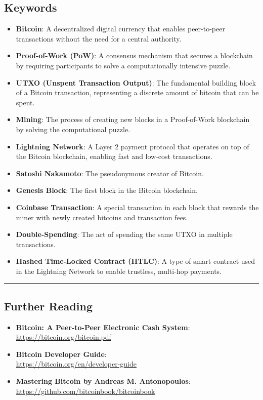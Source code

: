 \subsection{Keywords}\label{keywords}

\begin{itemize}
	\tightlist
	\item
	\textbf{Bitcoin}: A decentralized digital currency that enables
	peer-to-peer transactions without the need for a central authority.
	\item
	\textbf{Proof-of-Work (PoW)}: A consensus mechanism that secures a
	blockchain by requiring participants to solve a computationally
	intensive puzzle.
	\item
	\textbf{UTXO (Unspent Transaction Output)}: The fundamental building
	block of a Bitcoin transaction, representing a discrete amount of
	bitcoin that can be spent.
	\item
	\textbf{Mining}: The process of creating new blocks in a Proof-of-Work
	blockchain by solving the computational puzzle.
	\item
	\textbf{Lightning Network}: A Layer 2 payment protocol that operates
	on top of the Bitcoin blockchain, enabling fast and low-cost
	transactions.
	\item
	\textbf{Satoshi Nakamoto}: The pseudonymous creator of Bitcoin.
	\item
	\textbf{Genesis Block}: The first block in the Bitcoin blockchain.
	\item
	\textbf{Coinbase Transaction}: A special transaction in each block
	that rewards the miner with newly created bitcoins and transaction
	fees.
	\item
	\textbf{Double-Spending}: The act of spending the same UTXO in
	multiple transactions.
	\item
	\textbf{Hashed Time-Locked Contract (HTLC)}: A type of smart contract
	used in the Lightning Network to enable trustless, multi-hop payments.
\end{itemize}

\begin{center}\rule{0.5\linewidth}{0.5pt}\end{center}

\subsection{Further Reading}\label{further-reading}

\begin{itemize}
	\tightlist
	\item
	\textbf{Bitcoin: A Peer-to-Peer Electronic Cash System}:\\
	\url{https://bitcoin.org/bitcoin.pdf}
	\item
	\textbf{Bitcoin Developer Guide}:\\
	\url{https://bitcoin.org/en/developer-guide}
	\item
	\textbf{Mastering Bitcoin by Andreas M. Antonopoulos}:\\
	\url{https://github.com/bitcoinbook/bitcoinbook}
\end{itemize}
